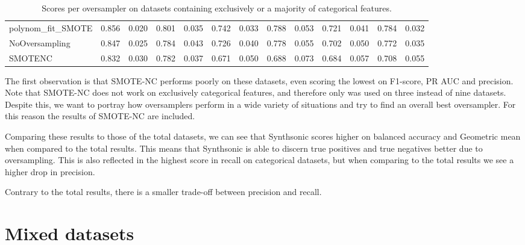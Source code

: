 \begin{table}[ht]
{\begin{tabular}{l|rr|rr|rr|rr|rr|rr}
        polynom\_fit\_SMOTE &              0.856 &                  0.020 &   0.801 &       0.035 &  0.742 &   0.033 &      0.788 &          0.053 &   0.721 &       0.041 &   0.784 &       0.032 \\
        NoOversampling    &              0.847 &                  0.025 &   0.784 &       0.043 &  0.726 &   0.040 &      0.778 &          0.055 &   0.702 &       0.050 &   0.772 &       0.035 \\
        SMOTENC           &              0.832 &                  0.030 &   0.782 &       0.037 &  0.671 &   0.050 &      0.688 &          0.073 &   0.684 &       0.057 &   0.708 &       0.055 \\
    \bottomrule
    \end{tabular}}
\caption{Scores per oversampler on datasets containing exclusively or a majority of categorical features.}
\label{tab:categorical}
\end{table}




The first observation is that SMOTE-NC performs poorly on these datasets, even scoring the lowest on F1-score, PR AUC and precision. Note that SMOTE-NC does not work on exclusively categorical features, and therefore only was used on three instead of nine datasets. Despite this, we want to portray how oversamplers perform in a wide variety of situations and try to find an overall best oversampler. For this reason the results of SMOTE-NC are included.

Comparing these results to those of the total datasets, we can see that Synthsonic scores higher on balanced accuracy and Geometric mean when compared to the total results. This means that Synthsonic is able to discern true positives and true negatives better due to oversampling. This is also reflected in the highest score in recall on categorical datasets, but when comparing to the total results we see a higher drop in precision. 

Contrary to the total results, there is a smaller trade-off between precision and recall.

\section{Mixed datasets}


